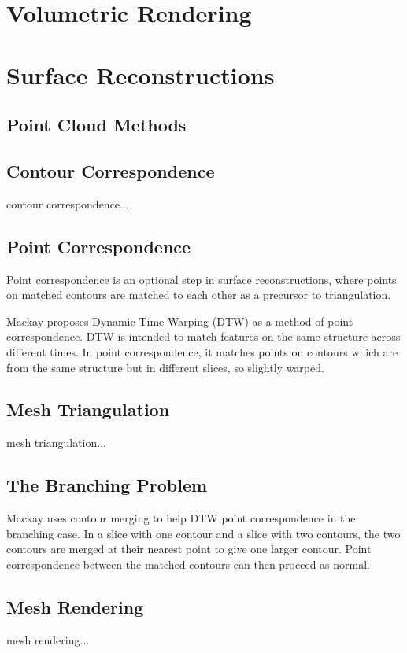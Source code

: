 \documentclass[acmsmall]{acmart}
\begin{document}
\section{Volumetric Rendering}

\section{Surface Reconstructions}

\subsection{Point Cloud Methods}


\subsection{Contour Correspondence}
contour correspondence...

\subsection{Point Correspondence}
Point correspondence is an optional step in surface reconstructions, where points on matched contours are matched to each other as a precursor to triangulation.

Mackay \cite{mackay2019robust} proposes Dynamic Time Warping (DTW) as a method of point correspondence. DTW is intended to match features on the same structure across different times. In point correspondence, it matches points on contours which are from the same structure but in different slices, so slightly warped. 

\subsection{Mesh Triangulation}
mesh triangulation...

\subsection{The Branching Problem}

Mackay \cite{mackay2019robust} uses contour merging to help DTW point correspondence in the branching case. In a slice with one contour and a slice with two contours, the two contours are merged at their nearest point to give one larger contour. Point correspondence between the matched contours can then proceed as normal.

\subsection{Mesh Rendering}
mesh rendering...
\end{document}
